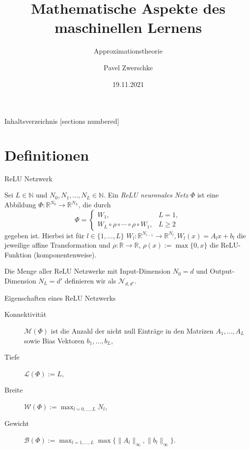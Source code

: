 \documentclass[10pt,aspectratio=169]{beamer}
\title{Mathematische Aspekte des maschinellen Lernens}
\subtitle{Approximationstheorie}
\date{19.11.2021}
\author{Pavel Zwerschke}
\institute{Karlsruher Institut für Technologie}
\theoremstyle{plain} %
\theoremstyle{remark} %
\newcommand{\N}{\mathbb{N}} %
\newcommand{\R}{\mathbb{R}} %
\newcommand{\set}[1]{\{#1\}}
\newcommand{\norm}[1]{\|#1\|}
\begin{document}
\maketitle

\begin{frame}{Inhaltsverzeichnis}
    [sections numbered]
    \tableofcontents%
\end{frame}

\section{Definitionen}

\begin{frame}{ReLU Netzwerk}
    \begin{definition}
        Sei \(L \in \N\) und \(N_0, N_1, \ldots, N_L \in \N\). Ein 
        \textit{ReLU neuronales Netz} \(\Phi\) ist eine Abbildung 
        \(\Phi: \R^{N_0} \rightarrow \R^{N_L}\), die durch 
        \[ \Phi = \begin{cases}
            W_1, & L = 1, \\
            W_L \circ \rho \circ \cdots \circ \rho \circ W_1, & L \geq 2
        \end{cases} \]
        gegeben ist. Hierbei ist für \(l\in \set{1,\ldots, L}\) \(W_l : \R^{N_{l-1}} \rightarrow \R^{N_l}, W_l(x) = A_l x + b_l\) 
        die jeweilige affine Transformation und \(\rho: \R \rightarrow \R\), \(\rho(x) := \max\set{0, x}\) 
        die ReLU-Funktion (komponentenweise).

        Die Menge aller ReLU Netzwerke mit Input-Dimension \(N_0 = d\) und Output-Dimension \(N_L = d'\) 
        definieren wir als \(\mathcal{N}_{d,d'}\).
    \end{definition}
\end{frame}

\begin{frame}{Eigenschaften eines ReLU Netzwerks}
    \begin{definition}
        \begin{description}
            \item[Konnektivität] \(\mathcal{M}(\Phi)\) ist die Anzahl der nicht null Einträge in den Matrizen \(A_1, \ldots, A_L\) 
            sowie Bias Vektoren \(b_1, \ldots, b_L\),
            \item[Tiefe] \(\mathcal{L}(\Phi) := L\),
            \item[Breite] \(\mathcal{W}(\Phi) := \max_{l=0,\ldots, L} N_l\),
            \item[Gewicht] \(\mathcal{B}(\Phi) := \max_{l=1,\ldots, L} \max\set{\norm{A_l}_\infty, \norm{b_l}_\infty}\).
        \end{description}
    \end{definition}
\end{frame}
\end{document}
